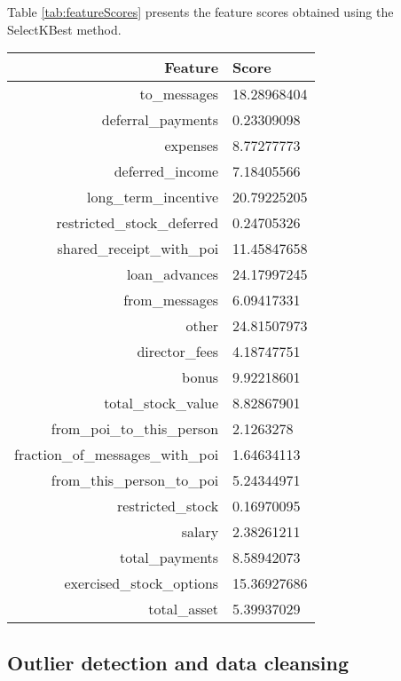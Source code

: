 \documentclass[11pt]{article}
\begin{document}
		Table \ref{tab:featureScores} presents the feature scores obtained using the SelectKBest method.
		
		\begin{table*}
			\caption{Features scores.}
			\begin{center}			
			\begin{tabular}{rl}
				\hline
				Feature & Score \\
				\hline
				to\_messages & 18.28968404 \\
deferral\_payments				& 0.23309098\\
expenses				& 8.77277773\\
deferred\_income				& 7.18405566\\
long\_term\_incentive				& 20.79225205\\
restricted\_stock\_deferred				& 0.24705326\\
shared\_receipt\_with\_poi				& 11.45847658\\
loan\_advances						& 24.17997245\\
from\_messages				& 6.09417331\\
other						& 24.81507973\\     
director\_fees		& 4.18747751\\
bonus					& 9.92218601\\
total\_stock\_value		& 8.82867901\\
from\_poi\_to\_this\_person			& 2.1263278\\
fraction\_of\_messages\_with\_poi                & 1.64634113\\
from\_this\_person\_to\_poi						& 5.24344971  \\
restricted\_stock					& 0.16970095\\
salary	& 2.38261211\\
total\_payments				& 8.58942073\\
exercised\_stock\_options				& 15.36927686 \\  
total\_asset				& 5.39937029\\

			   	\hline
			\end{tabular}
			\end{center}			
			\label{tab:featureScores}
		\end{table*}
			
	\subsection{Outlier detection and data cleansing}
	
\end{document}
